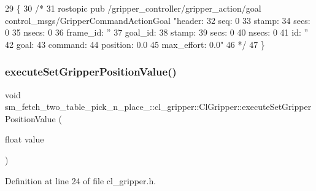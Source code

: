 \begin{DoxyCode}
29   \{
30     \textcolor{comment}{/*}
31 \textcolor{comment}{  rostopic pub /gripper\_controller/gripper\_action/goal control\_msgs/GripperCommandActionGoal "header:}
32 \textcolor{comment}{  seq: 0}
33 \textcolor{comment}{  stamp:}
34 \textcolor{comment}{    secs: 0}
35 \textcolor{comment}{    nsecs: 0}
36 \textcolor{comment}{  frame\_id: ''}
37 \textcolor{comment}{goal\_id:}
38 \textcolor{comment}{  stamp:}
39 \textcolor{comment}{    secs: 0}
40 \textcolor{comment}{    nsecs: 0}
41 \textcolor{comment}{  id: ''}
42 \textcolor{comment}{goal:}
43 \textcolor{comment}{  command:}
44 \textcolor{comment}{    position: 0.0}
45 \textcolor{comment}{    max\_effort: 0.0"}
46 \textcolor{comment}{    */}
47   \}
\end{DoxyCode}
\mbox{\label{classsm__fetch__two__table__pick__n__place__1_1_1cl__gripper_1_1ClGripper_a0e0d2274fe711deb299e90dd371584b5}} 
\subsubsection{\texorpdfstring{execute\+Set\+Gripper\+Position\+Value()}{executeSetGripperPositionValue()}}
{\footnotesize\ttfamily void sm\+\_\+fetch\+\_\+two\+\_\+table\+\_\+pick\+\_\+n\+\_\+place\+\_\+::cl\+\_\+gripper\+::\+Cl\+Gripper\+::execute\+Set\+Gripper\+Position\+Value (\begin{DoxyParamCaption}\item[{float}]{value }\end{DoxyParamCaption})\hspace{0.3cm}{\ttfamily [inline]}}



Definition at line 24 of file cl\+\_\+gripper.\+h.



